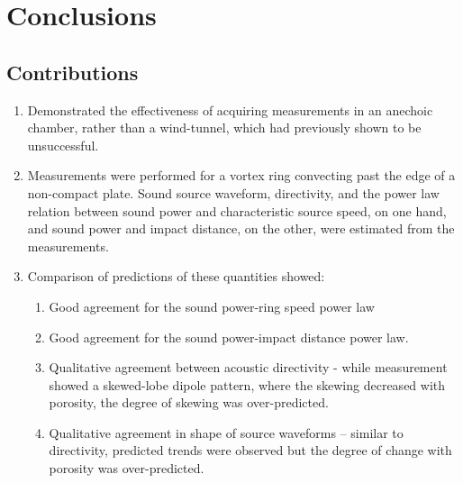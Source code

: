 \chapter{Conclusions}
\label{chapter:UQ_airfoil}
\graphicspath{{Chapter-5/graphics/}}

\section{Contributions}

\begin{enumerate}	
	\item Demonstrated the effectiveness of acquiring measurements in an anechoic chamber, rather than a wind-tunnel, which had previously shown to be unsuccessful. 
	
	\item Measurements were performed for a vortex ring convecting past the edge of a non-compact plate. Sound source waveform, directivity, and the power law relation between sound power and characteristic source speed, on one hand, and sound power and impact distance, on the other, were estimated from the measurements.
	
	\item Comparison of predictions of these quantities showed:
	\begin{enumerate}
		 \item Good agreement for the sound power-ring speed power law
		 \item Good agreement for the sound power-impact distance power law.
		 \item Qualitative agreement between acoustic directivity - while measurement showed a skewed-lobe dipole pattern, where the skewing decreased with porosity, the degree of skewing was over-predicted. 
		 \item Qualitative agreement in shape of source waveforms -- similar to directivity, predicted trends were observed but the degree of change with porosity was over-predicted.
	\end{enumerate}
\end{enumerate}
